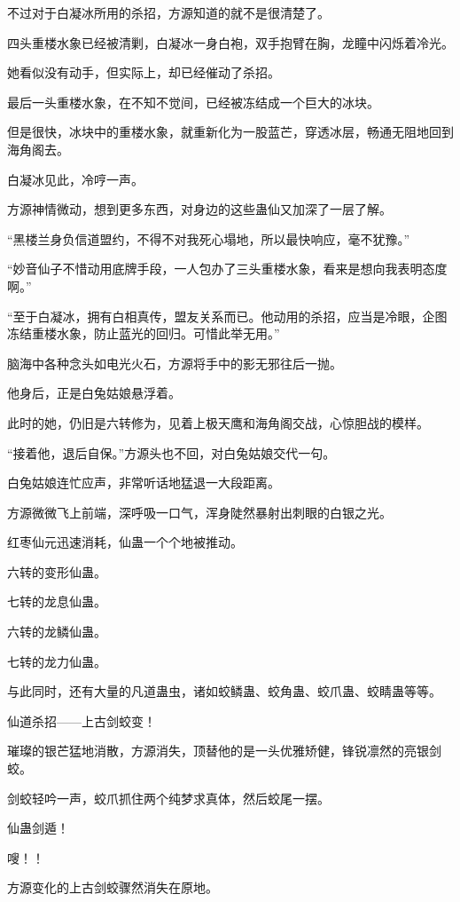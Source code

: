 \begin{this_body}
不过对于白凝冰所用的杀招，方源知道的就不是很清楚了。

四头重楼水象已经被清剿，白凝冰一身白袍，双手抱臂在胸，龙瞳中闪烁着冷光。

她看似没有动手，但实际上，却已经催动了杀招。

最后一头重楼水象，在不知不觉间，已经被冻结成一个巨大的冰块。

但是很快，冰块中的重楼水象，就重新化为一股蓝芒，穿透冰层，畅通无阻地回到海角阁去。

白凝冰见此，冷哼一声。

方源神情微动，想到更多东西，对身边的这些蛊仙又加深了一层了解。

“黑楼兰身负信道盟约，不得不对我死心塌地，所以最快响应，毫不犹豫。”

“妙音仙子不惜动用底牌手段，一人包办了三头重楼水象，看来是想向我表明态度啊。”

“至于白凝冰，拥有白相真传，盟友关系而已。他动用的杀招，应当是冷眼，企图冻结重楼水象，防止蓝光的回归。可惜此举无用。”

脑海中各种念头如电光火石，方源将手中的影无邪往后一抛。

他身后，正是白兔姑娘悬浮着。

此时的她，仍旧是六转修为，见着上极天鹰和海角阁交战，心惊胆战的模样。

“接着他，退后自保。”方源头也不回，对白兔姑娘交代一句。

白兔姑娘连忙应声，非常听话地猛退一大段距离。

方源微微飞上前端，深呼吸一口气，浑身陡然暴射出刺眼的白银之光。

红枣仙元迅速消耗，仙蛊一个个地被推动。

六转的变形仙蛊。

七转的龙息仙蛊。

六转的龙鳞仙蛊。

七转的龙力仙蛊。

与此同时，还有大量的凡道蛊虫，诸如蛟鳞蛊、蛟角蛊、蛟爪蛊、蛟睛蛊等等。

仙道杀招——上古剑蛟变！

璀璨的银芒猛地消散，方源消失，顶替他的是一头优雅矫健，锋锐凛然的亮银剑蛟。

剑蛟轻吟一声，蛟爪抓住两个纯梦求真体，然后蛟尾一摆。

仙蛊剑遁！

嗖！！

方源变化的上古剑蛟骤然消失在原地。


\end{this_body}
